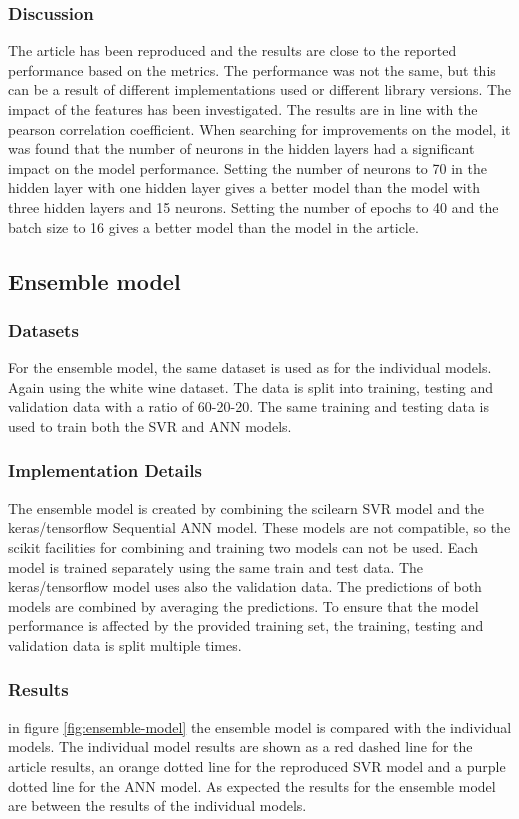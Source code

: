 \documentclass{article}
\begin{document}
\subsubsection{Discussion}
The article has been reproduced and the results are close to the reported performance based on the metrics.
The performance was not the same, but this can be a result of different implementations used or different library versions.
The impact of the features has been investigated. The results are in line with the pearson correlation coefficient.
When searching for improvements on the model, it was found that the number of neurons in the hidden layers had a significant impact on the model performance.
Setting the number of neurons to 70 in the hidden layer with one hidden layer gives a better model than the model with three hidden layers and 15 neurons.
Setting the number of epochs to 40 and the batch size to 16 gives a better model than the model in the article.

\subsection{Ensemble model}

\subsubsection{Datasets}
For the ensemble model, the same dataset is used as for the individual models. Again using the white wine dataset.
The data is split into training, testing and validation data with a ratio of 60-20-20.
The same training and testing data is used to train both the SVR and ANN models.

\subsubsection{Implementation Details}
The ensemble model is created by combining the scilearn SVR model and the keras/tensorflow Sequential ANN model.
These models are not compatible, so the scikit facilities for combining and training two models can not be used.
Each model is trained separately using the same train and test data. The keras/tensorflow model uses also the validation data.
The predictions of both models are combined by averaging the predictions.
To ensure that the model performance is affected by the provided training set, the training, testing and validation data is split multiple times.

\subsubsection{Results}
in figure \autoref{fig:ensemble-model} the ensemble model is compared with the individual models.
The individual model results are shown as a red dashed line for the article results,
an orange dotted line for the reproduced SVR model and a purple dotted line for the ANN model.
As expected the results for the ensemble model are between the results of the individual models.
\end{document}
